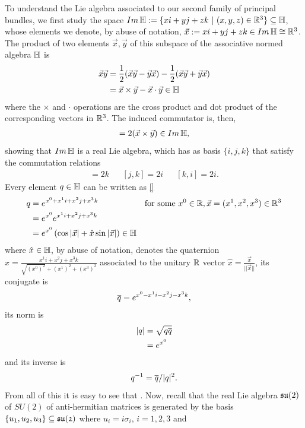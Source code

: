 To understand the Lie algebra associated to our second family of principal bundles, we first study the space $Im \operatorname{\mathbb{H}} := \{x i + y j + z k \ |\  (x, y, z) \in \mathbb{R}^3 \} \subseteq \operatorname{\mathbb{H}}$, whose elements we denote, by abuse of notation, $\vec x := x i + y j + z k \in Im \operatorname{\mathbb{H}} \cong \mathbb{R}^3$. The product of two elements $\vec x, \vec y$ of this subspace of the associative normed algebra $\operatorname{\mathbb{H}}$ is 
\begin{align*}
    \vec x \vec y &= \frac{1}{2}(\vec x \vec y - \vec y \vec x) - \frac{1}{2}(\vec x \vec y + \vec y \vec x) \\
    &= \vec x \times \vec y - \vec x \cdot \vec y \in \operatorname{\mathbb{H}}
\end{align*} where the $\times$ and $\cdot$ operations are the cross product and dot product of the corresponding vectors in $\mathbb{R}^3$. The induced commutator is, then,
\begin{align}
    [\vec x, \vec y] = 2 (\vec x \times \vec y) \in Im \HH,
\end{align} showing that $Im \operatorname{\mathbb{H}}$ is a real Lie algebra, which has as basis $\{i, j, k\}$ that satisfy the commutation relations
\begin{align}
    [i, j] = 2k && [j, k] = 2i && [k, i] = 2i. 
\end{align} Every element $q \in \operatorname{\mathbb{H}}$ can be written as \ref{}
\begin{align*}
    q &= e^{x^ 0 + x^1 i + x^2 j + x^3 k} & \text{for some } x^0 \in \mathbb{R}, \vec x = (x^1, x^2, x^3) \in \mathbb{R}^3 \\
     &= e^{x^0} e^{x^1 i + x^2 j + x^3 k}\\
     &= e^{x^0} \left( \cos |\vec x|  + \hat x \sin|\vec x| \right) \in \operatorname{\mathbb{H}}
\end{align*}
where $\hat x \in \operatorname{\mathbb{H}}$, by abuse of notation, denotes the quaternion $\hat x = \frac{x^1 i + x^2 j + x^3 k}{\sqrt{(x^0)^2} + (x^1)^2 + (x^3)^2}$ associated to the unitary $\mathbb{R}$ vector $\hat x = \frac{\vec x}{||\vec x||}$, its conjugate is
\begin{align*}
    \overline{q} = e^{x^ 0 - x^1 i - x^2 j - x^3 k},
\end{align*}
its norm is
\begin{align*}
    |q| &= \sqrt{q \overline{q}} \\
     &=e^{x^0}
\end{align*}
and its inverse is
\begin{align*}
    q^{-1} = \overline{q}/|q|^2.
\end{align*} 
From all of this it is easy to see that . Now, recall that the real Lie algebra $\mathfrak{su}(2)$ of $SU(2)$ of anti-hermitian matrices is generated by the basis $\left\{ u_1, u_2, u_3 \right\} \subseteq \mathfrak{su(2)}$ where $u_i = i \sigma_i$, $i = 1, 2, 3$ and
